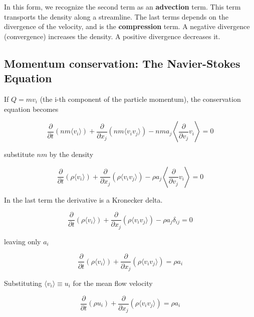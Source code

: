 In this form, we recognize the second term as an {\bf advection}
term. This term transports the density along a streamline. The last
terms depends on the divergence of the velocity, and is the {\bf compression} term. A negative divergence (convergence) increases the density. A positive divergence decreases it. 

\subsection{Momentum conservation: The Navier-Stokes Equation}

If $Q = mv_i$ (the i-th component of the particle momentum), the conservation equation becomes


\begin{equation}
\frac{\partial }{\partial t} \left(nm\langle v_i \rangle\right) + \frac{\partial}{\partial x_j} \left(nm\langle v_i  v_j \rangle\right) - nm a_j \left\langle \frac{\partial}{\partial v_j} v_i \right\rangle = 0 
\end{equation}

\noindent substitute $nm$ by the density


\begin{equation}
\frac{\partial }{\partial t} \left(\rho\langle v_i \rangle\right) + \frac{\partial}{\partial x_j} \left(\rho\langle v_i  v_j \rangle\right) - \rho a_j \left\langle \frac{\partial}{\partial v_j} v_i \right\rangle = 0 
\end{equation}

\noindent In the last term the derivative is a Kronecker delta. 


\begin{equation}
\frac{\partial }{\partial t} \left(\rho\langle v_i \rangle\right) + \frac{\partial}{\partial x_j} \left(\rho\langle v_i  v_j \rangle\right) - \rho a_j \delta_{ij} = 0 
\end{equation}

\noindent leaving only $a_i$


\begin{equation}
\frac{\partial }{\partial t} \left(\rho\langle v_i \rangle\right) + \frac{\partial}{\partial x_j} \left(\rho\langle v_i  v_j \rangle\right) = \rho a_i 
\end{equation}

\noindent Substituting $\langle v_i \rangle \equiv u_i$ for the mean flow velocity

\begin{equation}
\frac{\partial }{\partial t} \left(\rho u_i \right) + \frac{\partial}{\partial x_j} \left(\rho\langle v_i  v_j \rangle\right) = \rho a_i 
\end{equation}

